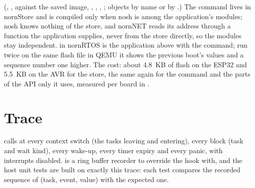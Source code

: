 (, ,  against the saved image, ,
, , ; objects by name or by .) The
command lives in nornStore and is compiled only when nosh is among the application's
modules; nosh knows nothing of the store, and nornNET reads its address through a
function the application supplies, never from the store directly, so the modules stay
independent.  in nornRTOS is the application above with the
command; run twice on the same flash file in QEMU it shows the previous boot's values
and a sequence number one higher. The cost: about 4.8~KB of flash on the ESP32 and
5.5~KB on the AVR for the store, the same again for the  command and the
parts of the API only it uses, measured per board in
.

\section{Trace}

 calls  at every context switch
(the tasks leaving and entering), every block (task and wait kind), every wake-up, every
timer expiry and every panic, with interrupts disabled.  is a ring
buffer recorder to override the hook with, and the host unit tests are built on exactly
this trace: each test compares the recorded sequence of (task, event, value) with the
expected one.
